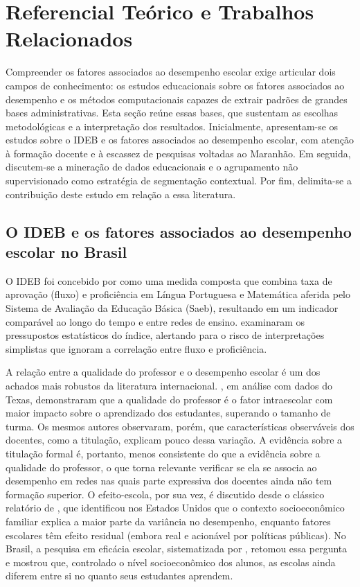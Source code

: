 \section{Referencial Teórico e Trabalhos Relacionados}
\label{sec:relacionados}

Compreender os fatores associados ao desempenho escolar exige articular dois campos de conhecimento: os estudos educacionais sobre os fatores associados ao desempenho e os métodos computacionais capazes de extrair padrões de grandes bases administrativas. Esta seção reúne essas bases, que sustentam as escolhas metodológicas e a interpretação dos resultados. Inicialmente, apresentam-se os estudos sobre o IDEB e os fatores associados ao desempenho escolar, com atenção à formação docente e à escassez de pesquisas voltadas ao Maranhão. Em seguida, discutem-se a mineração de dados educacionais e o agrupamento não supervisionado como estratégia de segmentação contextual. Por fim, delimita-se a contribuição deste estudo em relação a essa literatura.

\subsection{O IDEB e os fatores associados ao desempenho escolar no Brasil}

O IDEB foi concebido por \citet{fernandes2007} como uma medida composta que combina taxa de aprovação (fluxo) e proficiência em Língua Portuguesa e Matemática aferida pelo Sistema de Avaliação da Educação Básica (Saeb), resultando em um indicador comparável ao longo do tempo e entre redes de ensino. \citet{soares2013} examinaram os pressupostos estatísticos do índice, alertando para o risco de interpretações simplistas que ignoram a correlação entre fluxo e proficiência.

A relação entre a qualidade do professor e o desempenho escolar é um dos achados mais robustos da literatura internacional. \citet{rivkin2005}, em análise com dados do Texas, demonstraram que a qualidade do professor é o fator intraescolar com maior impacto sobre o aprendizado dos estudantes, superando o tamanho de turma. Os mesmos autores observaram, porém, que características observáveis dos docentes, como a titulação, explicam pouco dessa variação. A evidência sobre a titulação formal é, portanto, menos consistente do que a evidência sobre a qualidade do professor, o que torna relevante verificar se ela se associa ao desempenho em redes nas quais parte expressiva dos docentes ainda não tem formação superior. O efeito-escola, por sua vez, é discutido desde o clássico relatório de \citet{coleman1966}, que identificou nos Estados Unidos que o contexto socioeconômico familiar explica a maior parte da variância no desempenho, enquanto fatores escolares têm efeito residual (embora real e acionável por políticas públicas). No Brasil, a pesquisa em eficácia escolar, sistematizada por \citet{brooke2008}, retomou essa pergunta e mostrou que, controlado o nível socioeconômico dos alunos, as escolas ainda diferem entre si no quanto seus estudantes aprendem.

